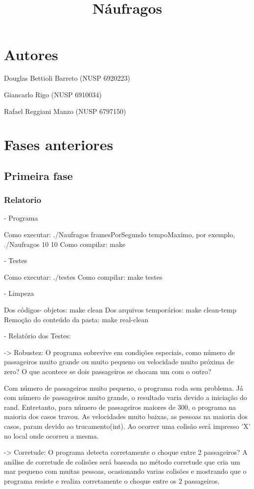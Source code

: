 \documentclass[a4paper,12pt]{article}
\author{ }
\title{N\'aufragos}
\begin{document}
\maketitle

\section{Autores}
Douglas Bettioli Barreto (NUSP 6920223)

Giancarlo Rigo (NUSP 6910034)

Rafael Reggiani Manzo (NUSP 6797150)
\section{Fases anteriores}
\label{sec:fasesanteriores}
\subsection{Primeira fase}
\subsubsection{Relatorio}
- Programa

Como executar: ./Naufragos framesPorSegundo tempoMaximo, por exemplo, ./Naufragos 10 10
Como compilar: make

- Testes

Como executar: ./testes 
Como compilar: make testes

- Limpeza

Dos códigos- objetos: 	      make clean
Dos arquivos temporários:     make clean-temp
Remoção do conteúdo da pasta: make real-clean

- Relatório dos Testes:

-> Robustez: O programa sobrevive em condições especiais, como número de passageiros muito grande ou muito pequeno ou velocidade muito próxima de zero? O que acontece se dois passageiros se chocam um com o outro? 

	Com número de passageiros muito pequeno, o programa roda sem problema. Já com número de passageiros muito grande, o resultado varia devido a iniciação do rand. Entretanto, para número de passageiros maiores de 300, o programa na maioria dos casos travou.
	As velocidades muito baixas, as pessoas na maioria dos casos, param devido ao trucamento(int).
	Ao ocorrer uma colisão será impresso 'X' no local onde ocorreu a mesma.

-> Corretude: O programa detecta corretamente o choque entre 2 passageiros?
	 A análise de corretude de colisões será baseada no método corretude que cria um mar pequeno com muitas pessoas, ocasionando varias colisões e 
mostrando que o programa resiste e realiza corretamente o choque entre os 2 passageiros.
\end{document}
